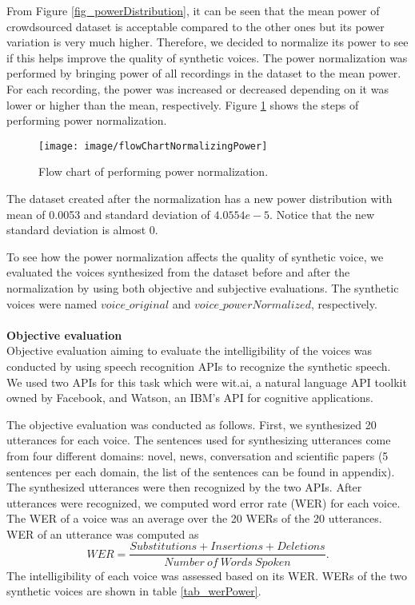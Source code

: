 \documentclass[12pt]{article}
\begin{document}
From Figure \ref{fig_powerDistribution}, it can be seen that the mean power of crowdsourced dataset is acceptable compared to the other ones but its power variation is very much higher. Therefore, we decided to normalize its power to see if this helps improve the quality of synthetic voices. The power normalization was performed by bringing power of all recordings in the dataset to the mean power. For each recording, the power was increased or decreased depending on it was lower or higher than the mean, respectively. Figure \ref{fig_normalizingPower} shows the steps of performing power normalization.
\begin{figure}[t]
\begin{center}
\texttt{[image: image/flowChartNormalizingPower]}
\end{center}
\vspace{-0.3cm}
\caption[performing power normalization.]{Flow chart of performing power normalization.}
\label{fig_normalizingPower}
\end{figure}
The dataset created after the normalization has a new power distribution with mean of 0.0053 and standard deviation of $4.0554e-5$. Notice that the new standard deviation is almost 0.

To see how the power normalization affects the quality of synthetic voice, we evaluated the voices synthesized from the dataset before and after the normalization by using both objective and subjective evaluations. The synthetic voices were named $voice\_original$ and $voice\_powerNormalized$, respectively.\\\\
\textbf{Objective evaluation}
\vspace{0.28cm}\\
Objective evaluation aiming to evaluate the intelligibility of the voices was conducted by using speech recognition APIs to recognize the synthetic speech. We used two APIs for this task which were wit.ai, a natural language API toolkit owned by Facebook, and Watson, an IBM’s API for cognitive applications.

The objective evaluation was conducted as follows. First, we synthesized 20 utterances for each voice. The sentences used for synthesizing utterances come from four different domains: novel, news, conversation and scientific papers (5 sentences per each domain, the list of the sentences can be found in appendix). The synthesized utterances were then recognized by the two APIs. After utterances were recognized, we computed word error rate (WER) for each voice. The WER of a voice was an average over the 20 WERs of the 20 utterances. WER of an utterance was computed as
\begin{equation}\label{exp_wer}
    WER = \frac{Substitutions + Insertions + Deletions}{Number\:of\:Words\:Spoken}.
\end{equation}
The intelligibility of each voice was assessed based on its WER. WERs of the two synthetic voices are shown in table \ref{tab_werPower}.
\end{document}
